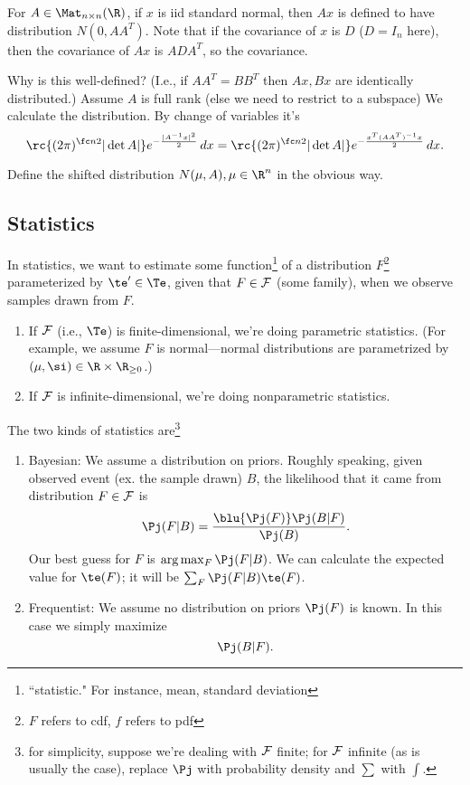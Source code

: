 For $A\in \Mat_{n\times n}(\R)$, if $x$ is iid standard normal, then $Ax$ is defined to have distribution $N(0,AA^T)$. Note that if the covariance of $x$ is $D$ ($D=I_n$ here), then the covariance of $Ax$ is $ADA^T$, so the covariance.

Why is this well-defined? (I.e., if $AA^T=BB^T$ then $Ax,Bx$ are identically distributed.) Assume $A$ is full rank (else we need to restrict to a subspace) We calculate the distribution. By change of variables it's
\[
\rc{(2\pi)^{\fc n2}|\det A|}e^{-\frac{|A^{-1}x|^2}{2}}\,dx = 
\rc{(2\pi)^{\fc n2}|\det A|}e^{-\frac{x^T(AA^T)^{-1}x}{2}}\,dx.
\]

Define the shifted distribution $N(\mu,A),\mu\in \R^n$ in the obvious way.

\subsection{Statistics}

In statistics, we want to estimate some function\footnote{``statistic." For instance, mean, standard deviation} of a distribution $F$\footnote{$F$ refers to cdf, $f$ refers to pdf} parameterized by $\te'\in \Te$, given that $F\in \cal F$ (some family), when we observe samples drawn from $F$.

\begin{enumerate}
\item
If $\cal F$ (i.e., $\Te$) is finite-dimensional, we're doing parametric statistics. (For example, we assume $F$ is normal---normal distributions are parametrized by $(\mu,\si)\in \R\times \R_{\ge0}$.)
\item
If $\cal F$ is infinite-dimensional, we're doing nonparametric statistics.
\end{enumerate}

The two kinds of statistics are\footnote{for simplicity, suppose we're dealing with $\cal F$ finite; for $\cal F$ infinite (as is usually the case), replace $\Pj$ with probability density and $\sum$ with $\int$.}
\begin{enumerate}
\item Bayesian: We assume a distribution on priors. Roughly speaking, given observed event (ex. the sample drawn) $B$, the likelihood that it came from distribution $F\in \cal F$ is 
\[
\Pj(F|B) = \frac{\blu{\Pj(F)} \Pj(B|F)}{\Pj(B)}.
\]
Our best guess for $F$ is $\arg\max_F \Pj(F|B)$. We can calculate the expected value for $\te(F)$; it will be $\sum_F \Pj(F|B) \te(F)$.
\item Frequentist: We assume no distribution on priors $\Pj(F)$ is known. In this case we simply maximize
\[
\Pj(B|F).
\]
\end{enumerate}

